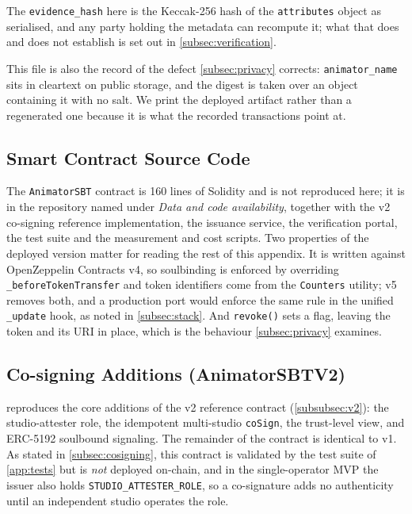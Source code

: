 The \texttt{evidence\_hash} here is the Keccak-256 hash of the \texttt{attributes}
object as serialised, and any party holding the metadata can recompute it; what that
does and does not establish is set out in \cref{subsec:verification}.

This file is also the record of the defect \cref{subsec:privacy} corrects:
\texttt{animator\_name} sits in cleartext on public storage, and the digest is taken
over an object containing it with no salt. We print the deployed artifact rather than
a regenerated one because it is what the recorded transactions point at.

\subsection{Smart Contract Source Code}
\label{app:source}

The \texttt{AnimatorSBT} contract is 160 lines of Solidity and is not reproduced
here; it is in the repository named under \emph{Data and code availability}, together
with the v2 co-signing reference implementation, the issuance service, the
verification portal, the test suite and the measurement and cost scripts. Two
properties of the deployed version matter for reading the rest of this appendix. It
is written against OpenZeppelin Contracts v4, so soulbinding is enforced by
overriding \texttt{\_beforeTokenTransfer} and token identifiers come from the
\texttt{Counters} utility; v5 removes both, and a production port would enforce the
same rule in the unified \texttt{\_update} hook, as noted in \cref{subsec:stack}.
And \texttt{revoke()} sets a flag, leaving the token and its URI in place, which is
the behaviour \cref{subsec:privacy} examines.

\subsection{Co-signing Additions (AnimatorSBTV2)}
\label{app:v2source}

 reproduces the core additions of the v2 reference contract
(\cref{subsubsec:v2}): the studio-attester role, the idempotent multi-studio
\texttt{coSign}, the trust-level view, and ERC-5192 soulbound signaling. The
remainder of the contract is identical to v1. As stated in
\cref{subsec:cosigning}, this contract is validated by the test suite of
\cref{app:tests} but is \emph{not} deployed on-chain, and in the single-operator
MVP the issuer also holds \texttt{STUDIO\_ATTESTER\_ROLE}, so a co-signature adds no
authenticity until an independent studio operates the role.

